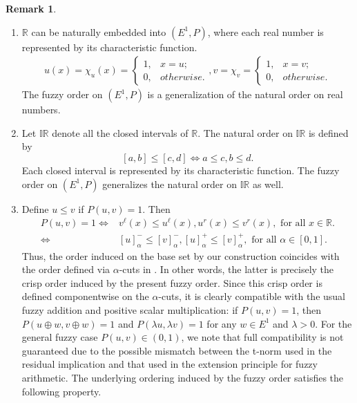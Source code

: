 \documentclass[preprint,3p,times]{elsarticle}
\theoremstyle{plain}
\theoremstyle{definition}
\newtheorem{remark}[thm]{Remark}
\numberwithin{equation}{section}
\begin{document}
\begin{remark}
\begin{enumerate}[label={\rm(\arabic*)}]
 \item \(\mathbb{R}\) can be naturally embedded into \((E^1, P)\), where each real number is represented by its characteristic function.
 \begin{align*}
	 u(x)=\chi_{u}(x)=\begin{cases}
	 	1,&x=u;\\
	 	0,& otherwise.
	 \end{cases}, v=\chi_{v}=\begin{cases}
	 1,& x=v;\\
	 0,&otherwise.
 \end{cases}
\end{align*}
 The fuzzy order on \((E^1, P)\) is  a generalization of the natural order on real numbers.
\item Let \(\mathbb{IR}\) denote all the closed intervals of \(\mathbb{R}\).  The natural order on \(\mathbb{IR}\) is defined by  \[[a,b]\le [c,d]\iff a\le c, b\le d. \]
  Each closed interval is represented by its characteristic function. The fuzzy order on \((E^1, P)\)  generalizes the natural order on \(\mathbb{IR}\) as well.
    \item Define \(u\le v\)  if \(P(u,v)=1\). Then 
\begin{align*}
P(u,v)=1 \iff& v^\ell (x)\le u^\ell (x), u^r(x)\le v^r(x), \text{ for all \(x\in \mathbb{R}\)}.\\
\iff& [u]^-_{\alpha}\le [v]^-_{\alpha}, [u]^+_{\alpha}\le [v]^+_{\alpha}, \text{ for all \(\alpha\in [0,1]\)}.
\end{align*}
Thus, the order induced on the base set by our construction coincides with the order defined via  \(\alpha\)-cuts in \cite{Klir1995FuzzySA}. In other words, the latter is precisely the crisp order induced by the present fuzzy order. Since this crisp order is defined componentwise on the $\alpha$-cuts, it is clearly compatible
with the usual fuzzy addition and positive scalar multiplication: if $P(u,v)=1$, then
$P(u \oplus w, v \oplus w)=1$ and $P(\lambda u, \lambda v)=1$ for any $w\in E^1$ and $\lambda>0$.
For the general fuzzy case $P(u,v)\in(0,1)$, we note that full compatibility is not guaranteed
due to the possible mismatch between the t-norm used in the residual implication and that used
in the extension principle for fuzzy arithmetic. The underlying ordering induced by the fuzzy order satisfies the following property.
\end{enumerate}
\end{remark}
\end{document}
